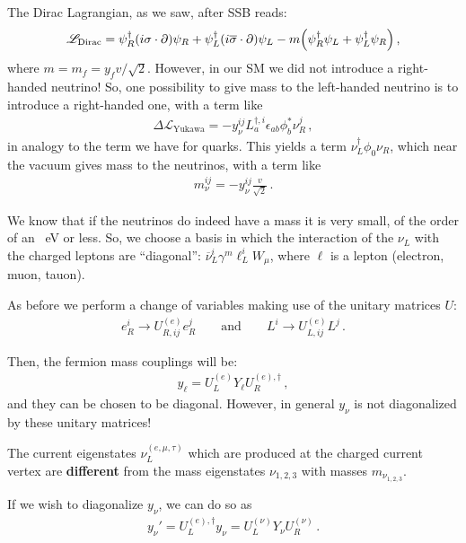 \documentclass[main.tex]{subfiles}
\begin{document}
The Dirac Lagrangian, as we saw, after SSB reads: 
%
\begin{align}
\mathscr{L} _{\text{Dirac}} = \psi ^\dag_{R} \qty(i \sigma \cdot \partial) \psi_{R} + \psi ^\dag_{L} \qty(i \overline{\sigma} \cdot \partial) \psi_{L} 
- m \qty(
 \psi ^\dag_{R} \psi_{L} 
+ \psi ^\dag_{L} \psi_{R} 
)
\,,
\end{align}
%
where \(m = m_f = y_f v/ \sqrt{2}\). 
However, in our SM we did not introduce a right-handed neutrino! 
So, one possibility to give mass to the left-handed neutrino is to introduce a right-handed one, with a term like 
%
\begin{align}
\Delta \mathscr{L} _{\text{Yukawa}} = 
- y^{ij}_{\nu } L ^{\dag, i}_{a} \epsilon_{ab} \phi^{*}_{b} \nu_{R}^{j}
\,,
\end{align}
%
in analogy to the term we have for quarks.
This yields a term \(\nu_{L} ^\dag \phi_0 \nu_{R} \), which near the vacuum gives mass to the neutrinos, with a term like 
%
\begin{align}
m^{ij}_{\nu } = - y^{ij}_{\nu } \frac{v}{\sqrt{2}}
\,.
\end{align}

We know that if the neutrinos do indeed have a mass it is very small, of the order of an \SI{}{eV} or less. 
So, we choose a basis in which the interaction of the \(\nu_{L}\) with the charged leptons are ``diagonal'': \(\overline{\nu}_{L}^{i} \gamma^{m } \ell^{i}_{L} W_{\mu }\), where \(\ell\) is a lepton (electron, muon, tauon).

As before we perform a change of variables making use of the unitary matrices \(U\): 
%
\begin{align}
e^{i}_{R} \to U^{(e)}_{R, ij} e^{j}_{R}
\qquad \text{and} \qquad
L^{i} \to U_{L, ij}^{(e)} L^{j}
\,.
\end{align}

Then, the fermion mass couplings will be: 
%
\begin{align}
y_\ell = U_L^{(e)} Y_\ell U_R^{(e),\dag}
\,,
\end{align}
%
and they can be chosen to be diagonal. However, in general \(y_\nu \) is not diagonalized by these unitary matrices! 

The current eigenstates \(\nu_{L}^{(e, \mu , \tau )}\) which are produced at the charged current vertex are \textbf{different} from the mass eigenstates \(\nu_{1, 2, 3}\) with masses \(m_{\nu_{1, 2, 3}}\).

If we wish to diagonalize \(y_\nu \), we can do so as 
%
\begin{align}
y_\nu' = U_L^{(e), \dag} y_\nu = U_L^{(\nu)} Y_\nu U_R^{(\nu )}
\,.
\end{align}
\end{document}
